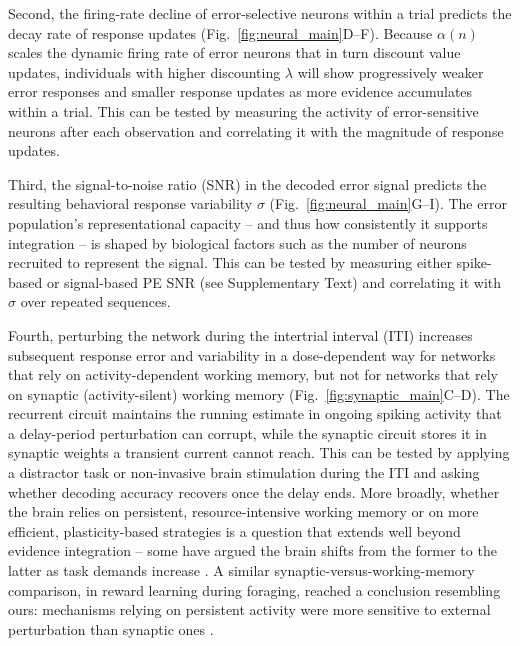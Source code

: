 \documentclass[12pt]{article}
\begin{document}
Second, the firing-rate decline of error-selective neurons within a trial predicts the decay rate of response updates (Fig.~\ref{fig:neural_main}D--F). Because $\alpha(n)$ scales the dynamic firing rate of error neurons that in turn discount value updates, individuals with higher discounting $\lambda$ will show progressively weaker error responses and smaller response updates as more evidence accumulates within a trial. This can be tested by measuring the activity of error-sensitive neurons after each observation and correlating it with the magnitude of response updates.

Third, the signal-to-noise ratio (SNR) in the decoded error signal predicts the resulting behavioral response variability $\sigma$ (Fig.~\ref{fig:neural_main}G--I). The error population's representational capacity -- and thus how consistently it supports integration -- is shaped by biological factors such as the number of neurons recruited to represent the signal. This can be tested by measuring either spike-based or signal-based PE SNR (see Supplementary Text) and correlating it with $\sigma$ over repeated sequences.

Fourth, perturbing the network during the intertrial interval (ITI) increases subsequent response error and variability in a dose-dependent way for networks that rely on activity-dependent working memory, but not for networks that rely on synaptic (activity-silent) working memory (Fig.~\ref{fig:synaptic_main}C--D). The recurrent circuit maintains the running estimate in ongoing spiking activity that a delay-period perturbation can corrupt, while the synaptic circuit stores it in synaptic weights a transient current cannot reach. This can be tested by applying a distractor task or non-invasive brain stimulation during the ITI and asking whether decoding accuracy recovers once the delay ends. More broadly, whether the brain relies on persistent, resource-intensive working memory or on more efficient, plasticity-based strategies is a question that extends well beyond evidence integration -- some have argued the brain shifts from the former to the latter as task demands increase \cite{collins2012much, westbrook2025striatal}. A similar synaptic-versus-working-memory comparison, in reward learning during foraging, reached a conclusion resembling ours: mechanisms relying on persistent activity were more sensitive to external perturbation than synaptic ones \cite{pereira2024brain}.
\end{document}
